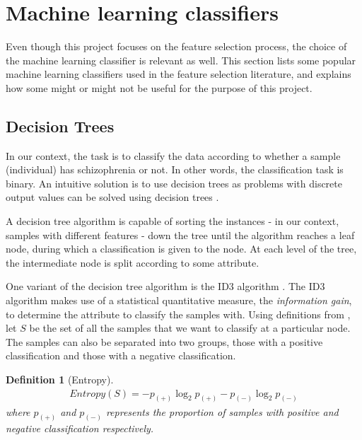 \documentclass[12pt, twoside, a4paper]{report}
\begin{document}
\section{Machine learning classifiers} \label{bg_ML}
Even though this project focuses on the feature selection process, the choice of the machine learning classifier is relevant as well. This section lists some popular machine learning classifiers used in the feature selection literature, and explains how some might or might not be useful for the purpose of this project.

\subsection{Decision Trees} \label{bg:ml:decisionTree}
In our context, the task is to classify the data according to whether a sample (individual) has schizophrenia or not. In other words, the classification task is binary. An intuitive solution is to use decision trees as problems with discrete output values can be solved using decision trees \cite{RefWorks:98}.

A decision tree algorithm is capable of sorting the  instances - in our context, samples with different features - down the tree until the algorithm reaches a leaf node, during which a classification is given to the node. At each level of the tree, the intermediate node is split according to some attribute.

One variant of the decision tree algorithm is the ID3 algorithm \cite{RefWorks:99}. The ID3 algorithm makes use of a statistical quantitative measure, the \textit{information gain}, to determine the attribute to classify the samples with. Using definitions from \cite{RefWorks:98}, let $S$ be the set of all the samples that we want to classify at a particular node. The samples can also be separated into two groups, those with a positive classification and those with a negative classification.\\

\newtheorem{mydef}{Definition}[subsection]

\begin{mydef}[Entropy]
\begin{align*}
Entropy(S) = -p_{(+)} \log_2 p_{(+)} - p_{(-)} \log_2 p_{(-)}
\end{align*}
where $p_{(+)}$ and $p_{(-)}$ represents the proportion of samples with positive and negative classification respectively.\\
\end{mydef}
\end{document}

